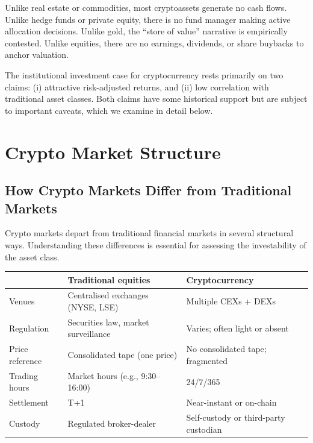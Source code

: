 \documentclass[11pt,a4paper]{article}
\begin{document}
Unlike real estate or commodities, most cryptoassets generate no cash flows. Unlike hedge funds or private equity, there is no fund manager making active allocation decisions. Unlike gold, the ``store of value'' narrative is empirically contested. Unlike equities, there are no earnings, dividends, or share buybacks to anchor valuation.

The institutional investment case for cryptocurrency rests primarily on two claims: (i) attractive risk-adjusted returns, and (ii) low correlation with traditional asset classes. Both claims have some historical support but are subject to important caveats, which we examine in detail below.

\section{Crypto Market Structure}

\subsection{How Crypto Markets Differ from Traditional Markets}

Crypto markets depart from traditional financial markets in several structural ways. Understanding these differences is essential for assessing the investability of the asset class.

\begin{center}
\begin{tabular}{lll}
\toprule
& \textbf{Traditional equities} & \textbf{Cryptocurrency} \\
\midrule
Venues & Centralised exchanges (NYSE, LSE) & Multiple CEXs + DEXs \\
Regulation & Securities law, market surveillance & Varies; often light or absent \\
Price reference & Consolidated tape (one price) & No consolidated tape; fragmented \\
Trading hours & Market hours (e.g., 9:30--16:00) & 24/7/365 \\
Settlement & T+1 & Near-instant or on-chain \\
Custody & Regulated broker-dealer & Self-custody or third-party custodian \\
\bottomrule
\end{tabular}
\end{center}
\end{document}
